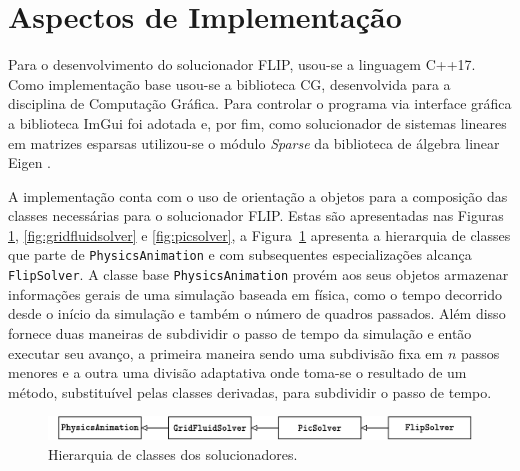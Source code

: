 \documentclass[12pt,a4paper,dvipsnames]{article}
\newcommand{\figref}[1]{Figura~\ref{#1}}
\begin{document}
\section{Aspectos de Implementação}
\label{sec:implementation}
Para o desenvolvimento do solucionador FLIP, usou-se a linguagem C++17. Como implementação base usou-se a biblioteca CG, desenvolvida para a disciplina de Computação Gráfica. Para controlar o programa via interface gráfica a biblioteca ImGui \cite{ImGui} foi adotada e, por fim, como solucionador de sistemas lineares em matrizes esparsas utilizou-se o módulo \textit{Sparse} da biblioteca de álgebra linear Eigen \cite{eigenweb}.

A implementação conta com o uso de orientação a objetos para a composição das classes necessárias para o solucionador FLIP. Estas são apresentadas nas Figuras \ref{fig:solvershierarchy}, \ref{fig:gridfluidsolver} e \ref{fig:picsolver}, a \figref{fig:solvershierarchy} apresenta a hierarquia de classes que parte de \texttt{PhysicsAnimation} e com subsequentes especializações alcança \texttt{FlipSolver}. A classe base \texttt{PhysicsAnimation} provém aos seus objetos armazenar informações gerais de uma simulação baseada em física, como o tempo decorrido desde o início da simulação e também o número de quadros passados. Além disso fornece duas maneiras de subdividir o passo de tempo da simulação e então executar seu avanço, a primeira maneira sendo uma subdivisão fixa em $n$ passos menores e a outra uma divisão adaptativa onde toma-se o resultado de um método, substituível pelas classes derivadas, para subdividir o passo de tempo.

\begin{figure}[ht]
    \centering
    \includegraphics[width=\textwidth]{Solvers.pdf}
    \caption{Hierarquia de classes dos solucionadores.}
    \label{fig:solvershierarchy}
\end{figure}
\end{document}
